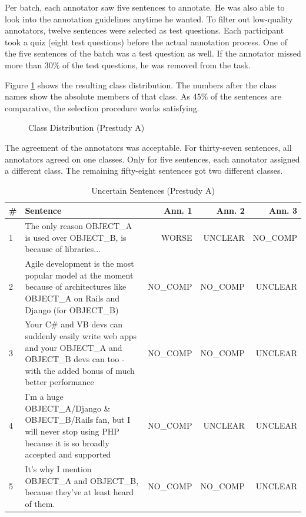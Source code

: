 Per batch, each annotator saw five sentences to annotate. He was also able to look into the annotation guidelines anytime he wanted. To filter out low-quality annotators, twelve sentences were selected as test questions. Each participant took a quiz (eight test questions) before the actual annotation process. One of the five sentences of the batch was a test question as well. If the annotator missed more than 30\% of the test questions, he was removed from the task. 

Figure \ref{fig:dist_pre_a} shows the resulting class distribution. The numbers after the class names show the absolute members of that class. As 45\% of the sentences are comparative, the selection procedure works satisfying.

\begin{figure}[h]
\centering
\caption{Class Distribution (Prestudy A)}
\label{fig:dist_pre_a}
\end{figure}

The agreement of the annotators was acceptable. For thirty-seven sentences, all annotators agreed on one classes. Only for five sentences, each annotator assigned a different class. The remaining fifty-eight sentences got two different classes.

\begin{table}[h]
\centering
\caption{Uncertain Sentences (Prestudy A)}
\label{tbl:pre_1_res}
\begin{tabularx}{\textwidth}{lXrrr}
\toprule
\# & Sentence        & Ann. 1  & Ann. 2 & Ann. 3             \\ \midrule
1 & The only reason OBJECT\_A is used over OBJECT\_B, is because of libraries... & WORSE & UNCLEAR & NO\_COMP\\
2 & Agile development is the most popular model at the moment because of architectures like OBJECT\_A on Rails and Django (for OBJECT\_B) & NO\_COMP & NO\_COMP & UNCLEAR\\
3 & Your C# and VB devs can suddenly easily write web apps and your OBJECT\_A and OBJECT\_B devs can too - with the added bonus of much better performance &  NO\_COMP & NO\_COMP & UNCLEAR \\
4 & I'm a huge OBJECT\_A/Django \& OBJECT\_B/Rails fan, but I will never stop using PHP because it is so broadly accepted and supported & NO\_COMP & UNCLEAR & UNCLEAR \\
5 & It's why I mention OBJECT\_A and OBJECT\_B, because they've at least heard of them. & NO\_COMP & NO\_COMP & UNCLEAR \\


\bottomrule                              
\end{tabularx}
\end{table}

